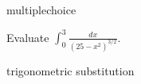 \documentclass{ximera}
\begin{document}
\begin{question}[2017C.06]
\begin{type}
multiplechoice
\end{type}
Evaluate \(\displaystyle \int_0^3 \frac{dx}{(25-x^2)^{3/2}}\).
\begin{multiplechoice}
\end{multiplechoice}
\begin{keywords}
trigonometric substitution
\end{keywords}
\end{question}
\end{document}
